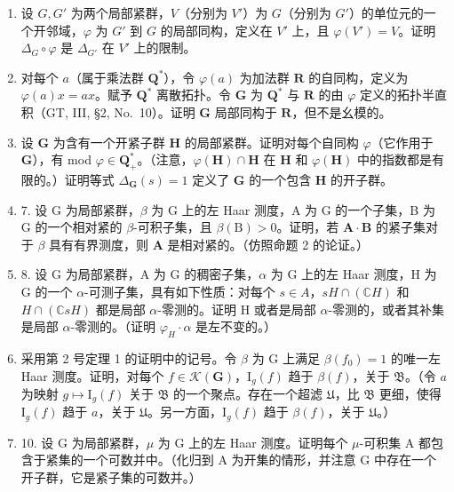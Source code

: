 \begin{enumerate}
\def\labelenumi{\arabic{enumi})}
\setcounter{enumi}{3}
\item
  设 \(G, G'\) 为两个局部紧群，\(V\)（分别为 \(V'\)）为 \(G\)（分别为 \(G'\)）的单位元的一个开邻域，\(\varphi\) 为 \(G'\) 到 \(G\) 的局部同构，定义在 \(V'\) 上，且 \(\varphi(V') = V\)。证明 \(\Delta_G \circ \varphi\) 是 \(\Delta_{G'}\) 在 \(V'\) 上的限制。
\item
  对每个 \(a\)（属于乘法群 \(\mathbf{Q}^*\)），令 \(\varphi(a)\) 为加法群 \(\mathbf{R}\) 的自同构，定义为 \(\varphi(a)x = ax\)。赋予 \(\mathbf{Q}^*\) 离散拓扑。令 \(\mathbf{G}\) 为 \(\mathbf{Q}^*\) 与 \(\mathbf{R}\) 的由 \(\varphi\) 定义的拓扑半直积（GT, III, §2, No.~10）。证明 \(\mathbf{G}\) 局部同构于 \(\mathbf{R}\)，但不是幺模的。
\item
  设 \(\mathbf{G}\) 为含有一个开紧子群 \(\mathbf{H}\) 的局部紧群。证明对每个自同构 \(\varphi\)（它作用于 \(\mathbf{G}\)），有 mod \(\varphi \in \mathbf{Q}_+^*\)。（注意，\(\varphi(\mathbf{H}) \cap \mathbf{H}\) 在 \(\mathbf{H}\) 和 \(\varphi(\mathbf{H})\) 中的指数都是有限的。）证明等式 \(\Delta_{\mathbf{G}}(s) = 1\) 定义了 \(\mathbf{G}\) 的一个包含 \(\mathbf{H}\) 的开子群。
\item
  7. 设 G 为局部紧群，\(\beta\) 为 G 上的左 Haar 测度，A 为 G 的一个子集，B 为 G 的一个相对紧的 \(\beta\)-可积子集，且 \(\beta(\mathrm{B}) > 0\)。证明，若 \(\mathbf{A} \cdot \mathbf{B}\) 的紧子集对于 \(\beta\) 具有有界测度，则 \(\mathbf{A}\) 是相对紧的。（仿照命题 2 的论证。）
\item
  8. 设 G 为局部紧群，A 为 G 的稠密子集，\(\alpha\) 为 G 上的左 Haar 测度，H 为 G 的一个 \(\alpha\)-可测子集，具有如下性质：对每个 \(s \in A\)，\(sH \cap (\mathbb{C}H)\) 和 \(H \cap (\mathbb{C}sH)\) 都是局部 \(\alpha\)-零测的。证明 H 或者是局部 \(\alpha\)-零测的，或者其补集是局部 \(\alpha\)-零测的。（证明 \(\varphi_{H} \cdot \alpha\) 是左不变的。）
\item
  采用第 2 号定理 1 的证明中的记号。令 \(\beta\) 为 G 上满足 \(\beta(f_0) = 1\) 的唯一左 Haar 测度。证明，对每个 \(f \in \mathcal{K}(\mathbf{G})\)，\(\mathrm{I}_g(f)\) 趋于 \(\beta(f)\)，关于 \(\mathfrak{B}\)。（令 \(a\) 为映射 \(g \mapsto \mathrm{I}_g(f)\) 关于 \(\mathfrak{B}\) 的一个聚点。存在一个超滤 \(\mathfrak{U}\)，比 \(\mathfrak{B}\) 更细，使得 \(\mathrm{I}_g(f)\) 趋于 \(a\)，关于 \(\mathfrak{U}\)。另一方面，\(\mathrm{I}_g(f)\) 趋于 \(\beta(f)\)，关于 \(\mathfrak{U}\)。）
\item
  10. 设 G 为局部紧群，\(\mu\) 为 G 上的左 Haar 测度。证明每个 \(\mu\)-可积集 A 都包含于紧集的一个可数并中。（化归到 A 为开集的情形，并注意 G 中存在一个开子群，它是紧子集的可数并。）
\end{enumerate}

